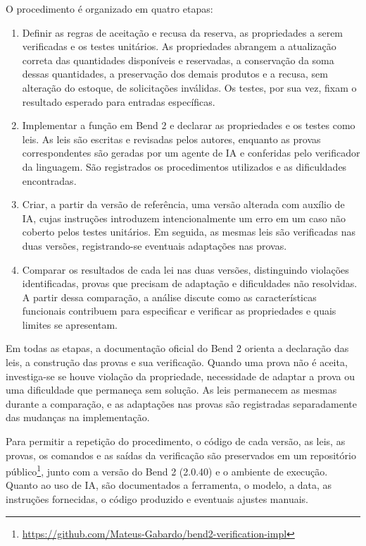 O procedimento é organizado em quatro etapas:
\begin{enumerate}[topsep=3pt,itemsep=2pt,parsep=0pt]
	\item Definir as regras de aceitação e recusa da reserva, as propriedades a serem verificadas e os testes unitários. As propriedades abrangem a atualização correta das quantidades disponíveis e reservadas, a conservação da soma dessas quantidades, a preservação dos demais produtos e a recusa, sem alteração do estoque, de solicitações inválidas. Os testes, por sua vez, fixam o resultado esperado para entradas específicas.
	\item Implementar a função em Bend 2 e declarar as propriedades e os testes como leis. As leis são escritas e revisadas pelos autores, enquanto as provas correspondentes são geradas por um agente de IA e conferidas pelo verificador da linguagem. São registrados os procedimentos utilizados e as dificuldades encontradas.
	\item Criar, a partir da versão de referência, uma versão alterada com auxílio de IA, cujas instruções introduzem intencionalmente um erro em um caso não coberto pelos testes unitários. Em seguida, as mesmas leis são verificadas nas duas versões, registrando-se eventuais adaptações nas provas.
	\item Comparar os resultados de cada lei nas duas versões, distinguindo violações identificadas, provas que precisam de adaptação e dificuldades não resolvidas. A partir dessa comparação, a análise discute como as características funcionais contribuem para especificar e verificar as propriedades e quais limites se apresentam.
\end{enumerate}

Em todas as etapas, a documentação oficial do Bend 2 \cite{BendGuide} orienta a declaração das leis, a construção das provas e sua verificação. Quando uma prova não é aceita, investiga-se se houve violação da propriedade, necessidade de adaptar a prova ou uma dificuldade que permaneça sem solução. As leis permanecem as mesmas durante a comparação, e as adaptações nas provas são registradas separadamente das mudanças na implementação.

Para permitir a repetição do procedimento, o código de cada versão, as leis, as provas, os comandos e as saídas da verificação são preservados em um repositório público\footnote{\url{https://github.com/Mateus-Gabardo/bend2-verification-impl}}, junto com a versão do Bend 2 (2.0.40) e o ambiente de execução. Quanto ao uso de IA, são documentados a ferramenta, o modelo, a data, as instruções fornecidas, o código produzido e eventuais ajustes manuais.

